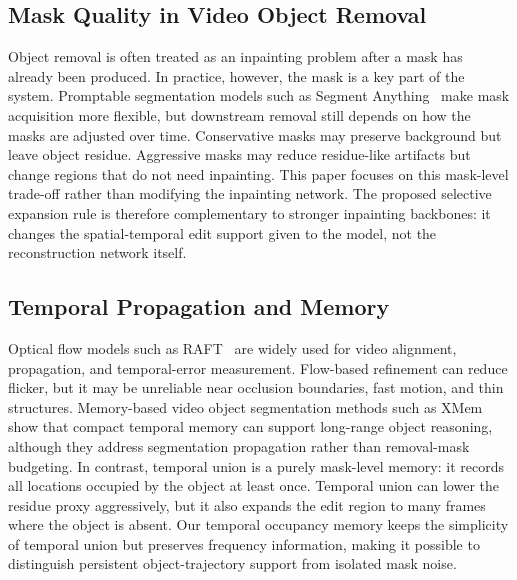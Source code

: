 \documentclass[nouppercase]{kaia}
\begin{document}
\subsection{Mask Quality in Video Object Removal}
Object removal is often treated as an inpainting problem after a mask has already been produced. In practice, however, the mask is a key part of the system. Promptable segmentation models such as Segment Anything~\cite{kirillov2023segment} make mask acquisition more flexible, but downstream removal still depends on how the masks are adjusted over time. Conservative masks may preserve background but leave object residue. Aggressive masks may reduce residue-like artifacts but change regions that do not need inpainting. This paper focuses on this mask-level trade-off rather than modifying the inpainting network. The proposed selective expansion rule is therefore complementary to stronger inpainting backbones: it changes the spatial-temporal edit support given to the model, not the reconstruction network itself.

\subsection{Temporal Propagation and Memory}
Optical flow models such as RAFT~\cite{teed2020raft} are widely used for video alignment, propagation, and temporal-error measurement. Flow-based refinement can reduce flicker, but it may be unreliable near occlusion boundaries, fast motion, and thin structures. Memory-based video object segmentation methods such as XMem~\cite{cheng2022xmem} show that compact temporal memory can support long-range object reasoning, although they address segmentation propagation rather than removal-mask budgeting. In contrast, temporal union is a purely mask-level memory: it records all locations occupied by the object at least once. Temporal union can lower the residue proxy aggressively, but it also expands the edit region to many frames where the object is absent. Our temporal occupancy memory keeps the simplicity of temporal union but preserves frequency information, making it possible to distinguish persistent object-trajectory support from isolated mask noise.
\end{document}
